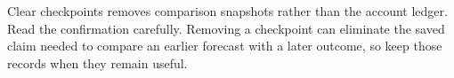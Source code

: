 Clear checkpoints removes comparison snapshots rather than the account ledger. Read the confirmation carefully. Removing a checkpoint can eliminate the saved claim needed to compare an earlier forecast with a later outcome, so keep those records when they remain useful.


